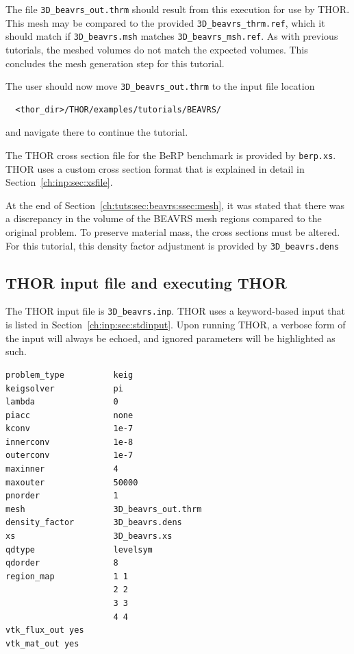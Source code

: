 The file \verb"3D_beavrs_out.thrm" should result from this execution for use by THOR.
This mesh may be compared to the provided \verb"3D_beavrs_thrm.ref", which it should match if \verb"3D_beavrs.msh" matches \verb"3D_beavrs_msh.ref".
As with previous tutorials, the meshed volumes do not match the expected volumes.
This concludes the mesh generation step for this tutorial.


The user should now move \verb"3D_beavrs_out.thrm" to the input file location
\begin{verbatim}
  <thor_dir>/THOR/examples/tutorials/BEAVRS/
\end{verbatim}
and navigate there to continue the tutorial.


The \ac{THOR} cross section file for the BeRP benchmark is provided by \verb"berp.xs".
\ac{THOR} uses a custom cross section format that is explained in detail in Section~\ref{ch:inp:sec:xsfile}.

At the end of Section~\ref{ch:tuts:sec:beavrs:ssec:mesh}, it was stated that there was a discrepancy in the volume of the BEAVRS mesh regions compared to the original problem.
To preserve material mass, the cross sections must be altered.
For this tutorial, this density factor adjustment is provided by \verb"3D_beavrs.dens"

\subsection{THOR input file and executing THOR}

The \ac{THOR} input file is \verb"3D_beavrs.inp".
\ac{THOR} uses a keyword-based input that is listed in Section~\ref{ch:inp:sec:stdinput}.
Upon running \ac{THOR}, a verbose form of the input will always be echoed, and ignored parameters will be highlighted as such.
\begin{verbatim}
problem_type          keig
keigsolver            pi
lambda                0
piacc                 none
kconv                 1e-7
innerconv             1e-8
outerconv             1e-7
maxinner              4
maxouter              50000
pnorder               1
mesh                  3D_beavrs_out.thrm
density_factor        3D_beavrs.dens
xs                    3D_beavrs.xs
qdtype                levelsym
qdorder               8
region_map            1 1
                      2 2
                      3 3
                      4 4
vtk_flux_out yes
vtk_mat_out yes
\end{verbatim}

